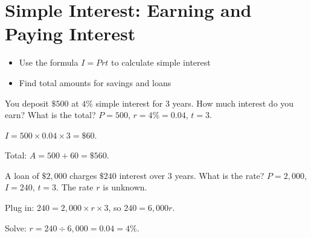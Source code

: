 \section{Simple Interest: Earning and Paying Interest}

\begin{stepGoal}
\begin{itemize}
    \item Use the formula $I = Prt$ to calculate simple interest
    \item Find total amounts for savings and loans
\end{itemize}
\end{stepGoal}

\begin{stepVocabBox}
\end{stepVocabBox}

\begin{stepsCard}
\end{stepsCard}

\begin{stepExample}{You deposit $\$500$ at $4\%$ simple interest for $3$ years. How much interest do you earn? What is the total?}
     $P = 500$, $r = 4\% = 0.04$, $t = 3$.

     $I = 500 \times 0.04 \times 3 = \$60$.

     Total: $A = 500 + 60 = \$560$.
\end{stepExample}

\begin{stepExample}{A loan of $\$2{,}000$ charges $\$240$ interest over $3$ years. What is the rate?}
     $P = 2{,}000$, $I = 240$, $t = 3$. The rate $r$ is unknown.

     Plug in: $240 = 2{,}000 \times r \times 3$, so $240 = 6{,}000r$.

     Solve: $r = 240 \div 6{,}000 = 0.04 = 4\%$.
\end{stepExample}

